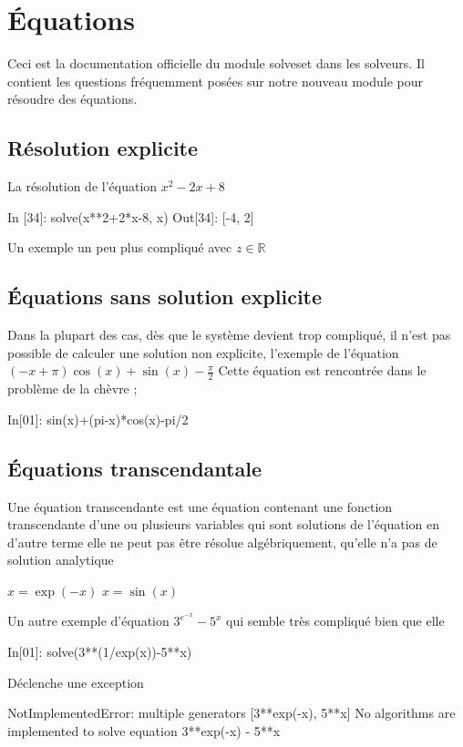 \section{Équations}
Ceci est la documentation officielle du module solveset dans les solveurs. Il contient les questions fréquemment posées sur notre nouveau module pour résoudre des équations.
 \subsection{Résolution explicite}
 La résolution de l’équation $x^{2}-2x+8$
 \begin{python}
In [34]: solve(x**2+2*x-8, x)                                                                     
Out[34]: [-4, 2]
\end{python}
Un exemple un peu plus compliqué avec $z \in \mathbb{R}$ 
 \subsection{Équations sans solution explicite}
Dans la plupart des cas, dès que le système devient trop compliqué, il n’est pas possible de calculer une 
solution non explicite, l'exemple de l’équation $\left(- x + \pi\right) \cos{\left (x \right )} + \sin{\left (x 
\right )} - \frac{\pi}{2}$ Cette équation est rencontrée dans le problème de la chèvre ;
\begin{python}
In[01]: sin(x)+(pi-x)*cos(x)-pi/2
\end{python}

\subsection{Équations transcendantale}
\begin{definition}
Une équation transcendante est une équation contenant une fonction transcendante d'une ou plusieurs variables 
qui sont solutions de l'équation en d'autre terme elle ne peut pas être résolue algébriquement, qu'elle n'a pas 
de solution analytique
\end{definition}
\begin{example}
$x = \exp(-x)$
$x = \sin(x)$
\end{example}

Un autre exemple d'équation $3^{e^{- x}}- 5^{x}$ qui semble très compliqué  bien que elle 
\begin{python}
In[01]: solve(3**(1/exp(x))-5**x)
\end{python}
Déclenche une exception 
\begin{python}
NotImplementedError: multiple generators [3**exp(-x), 5**x]
No algorithms are implemented to solve equation 3**exp(-x) - 5**x
\end{python}

